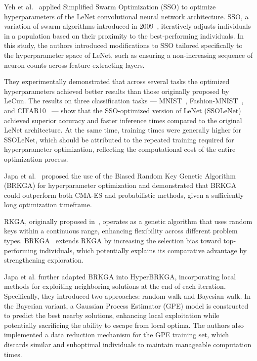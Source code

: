Yeh et al.~\cite{YEH2023109076} applied Simplified Swarm Optimization (SSO) to optimize hyperparameters of the LeNet convolutional neural network architecture.
SSO, a variation of swarm algorithms introduced in 2009~\cite{YEH20099192}, iteratively adjusts individuals in a population based on their proximity to the best-performing individuals. In this study, the authors introduced modifications to SSO tailored specifically to the hyperparameter space of LeNet, such as ensuring a non-increasing sequence of neuron counts across feature-extracting layers.

They experimentally demonstrated that across several tasks the optimized hyperparameters achieved better results than those originally proposed by LeCun.
The results on three classification tasks — MNIST~\cite{mnist}, Fashion-MNIST~\cite{fashionmnist}, and CIFAR10~\cite{cifar10} — show that the SSO-optimized version of LeNet (SSOLeNet) achieved superior accuracy and faster inference times compared to the original LeNet architecture. At the same time, training times were generally higher for SSOLeNet, which should be attributed to the repeated training required for hyperparameter optimization, reflecting the computational cost of the entire optimization process.

Japa et al.~\cite{10128116} proposed the use of the Biased Random Key Genetic Algorithm (BRKGA) for hyperparameter optimization and demonstrated that BRKGA could outperform both CMA-ES and probabilistic methods, given a sufficiently long optimization timeframe.

RKGA, originally proposed in~\cite{Bean1994}, operates as a genetic algorithm that uses random keys within a continuous range, enhancing flexibility across different problem types. BRKGA~\cite{GoncalvesResende2011} extends RKGA by increasing the selection bias toward top-performing individuals, which potentially explains its comparative advantage by strengthening exploration.

Japa et al. further adapted BRKGA into HyperBRKGA, incorporating local methods for exploiting neighboring solutions at the end of each iteration. Specifically, they introduced two approaches: random walk and Bayesian walk. In the Bayesian variant, a Gaussian Process Estimator (GPE) model is constructed to predict the best nearby solutions, enhancing local exploitation while potentially sacrificing the ability to escape from local optima. The authors also implemented a data reduction mechanism for the GPE training set, which discards similar and suboptimal individuals to maintain manageable computation times.

